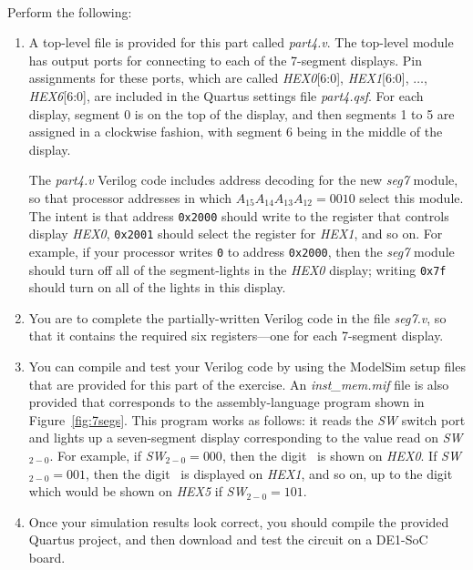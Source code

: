 \documentclass[epsfig,10pt,fullpage]{article}
\begin{document}
~\\
\noindent
Perform the following:

\begin{enumerate}
\item A top-level file is provided for this part
called {\it part4.v}. The top-level module has output ports for connecting
to each of the 7-segment displays. 
Pin assignments for these ports, which are called {\it HEX0}[6:0], {\it HEX1}[6:0], 
$\ldots$, {\it HEX6}[6:0], are included in the Quartus settings file {\it part4.qsf}. 
For each display, segment 0 is on the top of the display, and then segments 1 to 5 are assigned
in a clockwise fashion, with segment 6 being in the middle of the display.

The {\it part4.v} Verilog code includes address decoding for the new {\it seg7} module, 
so that processor addresses in which $A_{15} A_{14} A_{13} A_{12} = 0010$ select this module.
The intent is that address \texttt{0x2000} should write to the register that controls 
display {\it HEX0}, \texttt{0x2001} should select the register for {\it HEX1}, and 
so on. For example, if your processor 
writes \texttt{0} to address \texttt{0x2000}, then the {\it seg7} module
should turn off all of the segment-lights in the {\it HEX0} display; writing \texttt{0x7f} 
should turn on all of the lights in this display. 

\item 
You are to complete the partially-written Verilog code in the file {\it seg7.v}, so that
it contains the required six registers---one for each 7-segment display. 
        
\item You can compile and test your Verilog code by using the ModelSim setup files that 
are provided for this part of the exercise. An {\it inst\_mem.mif} file is also provided
that corresponds to the assembly-language program shown in 
Figure~\ref{fig:7segs}. This program works as follows: it reads the {\it SW} switch port and 
lights up a seven-segment display corresponding to the value read on {\it SW}$_{2-0}$. For
example, if {\it SW}$_{2-0} = 000$, then the digit~\texttt{} is shown on {\it HEX0}.
If {\it SW}$_{2-0} = 001$, then the digit~\texttt{} is displayed on {\it HEX1}, 
and so on, up to the digit~\texttt{} which would be shown on {\it HEX5} if
{\it SW}$_{2-0} = 101$.

\item Once your simulation results look correct, you should compile the provided Quartus
project, and then download and test the circuit on a DE1-SoC board.
\end{enumerate}
\end{document}
